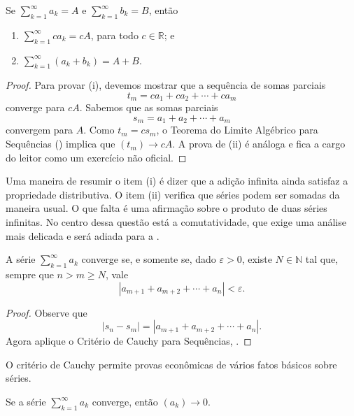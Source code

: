 \begin{theorem}\label{thm:limite-algebrico-series}
Se $\sum_{k=1}^{\infty}a_k=A$ e $\sum_{k=1}^{\infty}b_k=B$, então
\begin{enumerate}[label=(\roman*)]
\item $\displaystyle\sum_{k=1}^{\infty}ca_k=cA$, para todo $c\in\mathbb{R}$; e
\item $\displaystyle\sum_{k=1}^{\infty}(a_k+b_k)=A+B$.
\end{enumerate}
\end{theorem}

\begin{proof}
Para provar (i), devemos mostrar que a sequência de somas parciais
\[
t_m=ca_1+ca_2+\cdots+ca_m
\]
converge para $cA$. Sabemos que as somas parciais
\[
s_m=a_1+a_2+\cdots+a_m
\]
convergem para $A$. Como $t_m=cs_m$, o Teorema do Limite Algébrico para Sequências () implica que $(t_m)\to cA$. A prova de (ii) é análoga e fica a cargo do leitor como um exercício não oficial.
\end{proof}

Uma maneira de resumir o item (i) é dizer que a adição infinita ainda satisfaz a propriedade distributiva. O item (ii) verifica que séries podem ser somadas da maneira usual. O que falta é uma afirmação sobre o produto de duas séries infinitas. No centro dessa questão está a comutatividade, que exige uma análise mais delicada e será adiada para a .

 
\begin{theorem}\label{thm:criterio-cauchy-series}
A série $\sum_{k=1}^{\infty}a_k$ converge se, e somente se, dado $\varepsilon>0$, existe $N\in\mathbb{N}$ tal que, sempre que $n>m\geq N$, vale
\[
\left|a_{m+1}+a_{m+2}+\cdots+a_n\right|<\varepsilon.
\]
\end{theorem}

\begin{proof}
Observe que
\[
|s_n-s_m|=|a_{m+1}+a_{m+2}+\cdots+a_n|.
\]
Agora aplique o Critério de Cauchy para Sequências, .
\end{proof}

O critério de Cauchy permite provas econômicas de vários fatos básicos sobre séries.

\begin{theorem}\label{thm:termo-geral-zero}
Se a série $\sum_{k=1}^{\infty}a_k$ converge, então $(a_k)\to0$.
\end{theorem}

